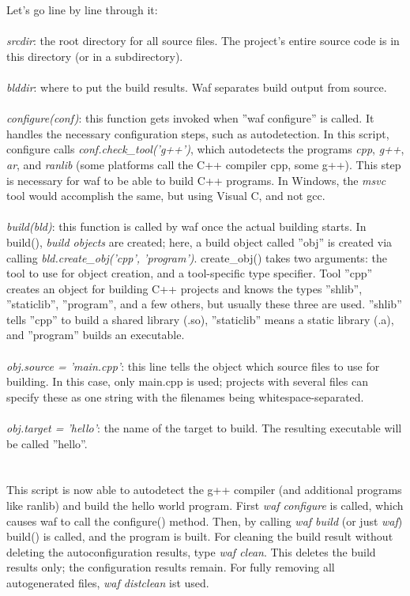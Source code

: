 \documentclass[a4,10pt]{article}
\begin{document}
Let's go line by line through it:\\
\\
\emph{srcdir}: the root directory for all source files. The project's entire source code is in this directory (or in a subdirectory).\\
\\
\emph{blddir}: where to put the build results. Waf separates build output from source.\\
\\
\emph{configure(conf)}: this function gets invoked when ''waf configure'' is called. It handles the necessary configuration steps, such as autodetection. In this script, configure calls \emph{conf.check\_tool('g++')}, which autodetects the programs \emph{cpp}, \emph{g++}, \emph{ar}, and \emph{ranlib} (some platforms call the C++ compiler cpp, some g++). This step is necessary for waf to be able to build C++ programs. In Windows, the \emph{msvc} tool would accomplish the same, but using Visual C, and not gcc.\\
\\
\emph{build(bld)}: this function is called by waf once the actual building starts.
In build(), \emph{build objects} are created; here, a build object called ''obj'' is created via calling \emph{bld.create\_obj('cpp', 'program')}. create\_obj() takes two arguments: the tool to use for object creation, and a tool-specific type specifier. Tool ''cpp'' creates an object for building C++ projects and knows the types ''shlib'', ''staticlib'', ''program'', and a few others, but usually these three are used. ''shlib'' tells ''cpp'' to build a shared library (.so), ''staticlib'' means a static library (.a), and ''program'' builds an executable.\\
\\
\emph{obj.source = 'main.cpp'}: this line tells the object which source files to use for building. In this case, only main.cpp is used; projects with several files can specify these as one string with the filenames being whitespace-separated.\\
\\
\emph{obj.target = 'hello'}: the name of the target to build. The resulting executable will be called ''hello''.\\\\
\\
This script is now able to autodetect the g++ compiler (and additional programs like ranlib) and build the hello world program. First \emph{waf configure} is called, which causes waf to call the configure() method. Then, by calling \emph{waf build} (or just \emph{waf}) build() is called, and the program is built. For cleaning the build result without deleting the autoconfiguration results, type \emph{waf clean}. This deletes the build results only; the configuration results remain. For fully removing all autogenerated files, \emph{waf distclean} ist used.
\end{document}
